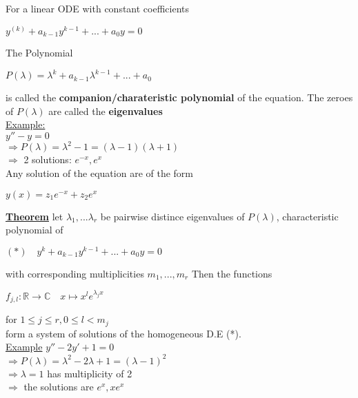 \documentclass[8pt]{extreport}
\begin{document}
 For a linear ODE with constant coefficients
\begin{center}
$y^{(k)} + a_{k-1}y^{k-1} + ... + a_0y = 0$
\end{center}
The Polynomial
\begin{center}
$P(\lambda) = \lambda^{k} + a_{k-1}\lambda^{k-1} + ... + a_0$
\end{center}
is called the \textbf{companion/charateristic polynomial} of the equation. The zeroes of $P(\lambda)$ are called the \textbf{eigenvalues}\\
\underline{Example:}\\
$y''-y = 0$\\
$\Rightarrow P(\lambda) = \lambda^2-1 = (\lambda- 1)(\lambda + 1)$\\
$\Rightarrow$ 2 solutions: $e^{-x},e^{x}$\\
Any solution of the equation are of the form
\begin{center}
$y(x) = z_1e^{-x} + z_2e^{x}$
\end{center}

\underline{\textbf{Theorem}} let $\lambda_1,...\lambda_r$ be pairwise distince eigenvalues of $P(\lambda)$, characteristic polynomial of 
\begin{center}
$(*)\quad y^k + a_{k-1}y^{k-1} + ... + a_0y = 0$
\end{center}
with corresponding multiplicities $m_1,...,m_r$ Then the functions
\begin{center}
$f_{j,l} :\mathbb{R} \rightarrow \mathbb{C} \quad x \mapsto x^le^{\lambda_jx}$
\end{center}
for $1 \leq j \leq r, 0 \leq l < m_j$\\
form a system of solutions of the homogeneous D.E (*).\\
\newline
\underline{Example}
$y'' -2y' + 1 = 0$\\
$\Rightarrow P(\lambda) = \lambda^2 - 2 \lambda + 1 = (\lambda -1)^2$\\
$\Rightarrow \lambda = 1$ has multiplicity of 2\\
$\Rightarrow$ the solutions are $e^x, xe^x$
\end{document}
